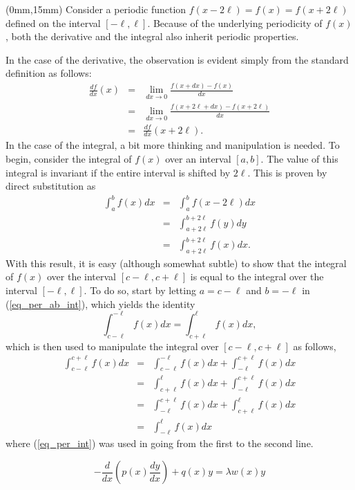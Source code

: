 \documentclass[10pt]{article}
\begin{document}
\begin{textblock*}{90mm}(0mm,15mm)
Consider a periodic function $f(x-2\ell) = f(x) = f(x + 2\ell)$ defined on the interval $[-\ell,\ell]$.  
Because of the underlying periodicity of $f(x)$, both the derivative and the integral also inherit 
periodic properties.

In the case of the derivative, the observation is evident simply from 
the standard definition as follows:
\begin{eqnarray*}
  \frac{d f}{d x}(x) & = & \lim_{dx \rightarrow 0} \frac{ f(x+dx)-f(x)}{dx}\\
                     & = & \lim_{dx \rightarrow 0} \frac{ f(x + 2\ell + dx) - f(x + 2\ell) }{dx} \\
                     & = & \frac{d f}{d x}(x + 2\ell).
\end{eqnarray*}
In the case of the integral, a bit more thinking and manipulation is needed.
To begin, consider the integral of $f(x)$ over an interval $[a,b]$.  The value of this integral 
is invariant if the entire interval is shifted by $2 \ell$.  This is proven by direct substitution
as 
\begin{eqnarray}\label{eq_per_ab_int}
  \int_{a}^{b} f(x) dx & = & \int_{a}      ^{b}       f(x - 2\ell) dx            \\
                       & = & \int_{a+2\ell}^{b+2\ell} f(y)         dy  \nonumber \\
                       & = & \int_{a+2\ell}^{b+2\ell} f(x)         dx. \nonumber
\end{eqnarray}
With this result, it is easy (although somewhat subtle) to show that the integral
of $f(x)$ over the interval $[c-\ell,c+\ell]$ is equal to the integral over 
the interval $[-\ell,\ell]$.  To do so, start by letting $a = c - \ell$ and $b = -\ell$
in (\ref{eq_per_ab_int}), which yields the identity 
\begin{equation}\label{eq_per_int}
  \int_{c-\ell}^{-\ell} f(x) dx  =  \int_{c+\ell}^{\ell} f(x) dx,
\end{equation}
which is then used to manipulate the integral over $[c-\ell,c+\ell]$ as follows,
\begin{eqnarray} 
  \int_{c-\ell}^{c+\ell} f(x) dx  & = &  \int_{c-\ell}^{-\ell} f(x) dx + \int_{-\ell}^{c+\ell} f(x) dx \\
                                  & = &  \int_{c+\ell}^{\ell}  f(x) dx + \int_{-\ell}^{c+\ell} f(x) dx \nonumber \\
                                  & = &  \int_{-\ell}^{c+\ell} f(x) dx + \int_{c+\ell}^{\ell}  f(x) dx \nonumber \\
                                  & = &  \int_{-\ell}^{\ell}   f(x) dx                                 \nonumber
\end{eqnarray}
where (\ref{eq_per_int}) was used in going from the first to the second line.

\[
  -\frac{d}{d x}\left( p(x) \frac{d y}{d x} \right) + q(x) y = \lambda w(x) y
\]
\end{textblock*}
\end{document}
